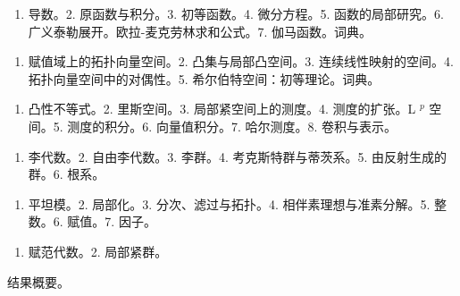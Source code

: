 
\begin{enumerate}
\def\labelenumi{\arabic{enumi}.}
\tightlist
\item
  导数。2. 原函数与积分。3. 初等函数。4. 微分方程。5. 函数的局部研究。6. 广义泰勒展开。欧拉-麦克劳林求和公式。7. 伽马函数。词典。
\end{enumerate}


\begin{enumerate}
\def\labelenumi{\arabic{enumi}.}
\tightlist
\item
  赋值域上的拓扑向量空间。2. 凸集与局部凸空间。3. 连续线性映射的空间。4. 拓扑向量空间中的对偶性。5. 希尔伯特空间：初等理论。词典。
\end{enumerate}


\begin{enumerate}
\def\labelenumi{\arabic{enumi}.}
\tightlist
\item
  凸性不等式。2. 里斯空间。3. 局部紧空间上的测度。4. 测度的扩张。L \(^{p}\) 空间。5. 测度的积分。6. 向量值积分。7. 哈尔测度。8. 卷积与表示。
\end{enumerate}


\begin{enumerate}
\def\labelenumi{\arabic{enumi}.}
\tightlist
\item
  李代数。2. 自由李代数。3. 李群。4. 考克斯特群与蒂茨系。5. 由反射生成的群。6. 根系。
\end{enumerate}


\begin{enumerate}
\def\labelenumi{\arabic{enumi}.}
\tightlist
\item
  平坦模。2. 局部化。3. 分次、滤过与拓扑。4. 相伴素理想与准素分解。5. 整数。6. 赋值。7. 因子。
\end{enumerate}


\begin{enumerate}
\def\labelenumi{\arabic{enumi}.}
\tightlist
\item
  赋范代数。2. 局部紧群。
\end{enumerate}


结果概要。

